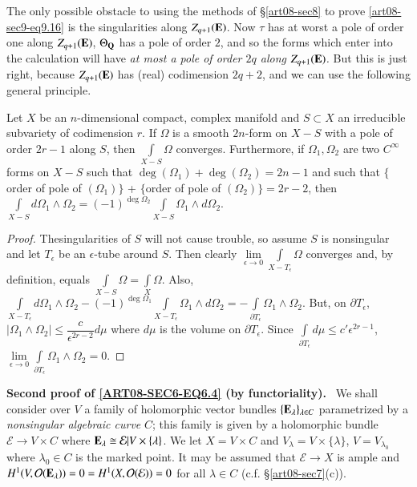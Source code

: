 The only possible obstacle to using the methods of \S\ref{art08-sec8} to prove \eqref{art08-sec9-eq9.16} is the singularities along $Z_{q+1}(\mathbf{E})$. Now $\tau$ has at worst a pole of order one along $Z_{q+1}(\mathbf{E})$, $\Theta_{\mathbf{Q}}$ has a pole of order $2$, and so the forms which enter into the calculation will have {\em at most a pole of order $2q$ along $Z_{q+1}(\mathbf{E})$.} But this is just right, because $Z_{q+1}(\mathbf{E})$ has (real) codimension $2q+2$, and we can use the following general principle.

Let $X$ be an $n$-dimensional compact, complex manifold and $S\subset X$ an irreducible subvariety of codimension $r$. If $\Omega$ is a smooth $2n$-form on $X-S$ with a pole of order $2r-1$ along $S$, then $\int\limits_{X-S}\Omega$ converges. Furthermore, if $\Omega_{1},\Omega_{2}$ are two $C^{\infty}$ forms on $X-S$ such that $\deg(\Omega_{1})+\deg (\Omega_{2})=2n-1$ and such that $\{$order of pole of $(\Omega_{1})\}$ + $\{$order of pole of $(\Omega_{2})\}=2r-2$, then $\int\limits_{X-S}d\Omega_{1}\wedge \Omega_{2}=(-1)^{\deg\Omega_{2}}\int\limits_{X-S}\Omega_{1}\wedge d\Omega_{2}$.

\begin{proof}
The\pageoriginale singularities of $S$ will not cause trouble, so assume $S$ is nonsingular and let $T_{\epsilon}$ be an $\epsilon$-tube around $S$. Then clearly $\lim\limits_{\epsilon\to 0}\int\limits_{X-T_{\epsilon}}\Omega$ converges and, by definition, equals $\int\limits_{X-S}\Omega=\int\limits_{X}\Omega$. Also, $\int\limits_{X-T_{\epsilon}}d\Omega_{1}\wedge\Omega_{2}-(-1)^{\deg \Omega_{1}}\int\limits_{X-T_{\epsilon}}\Omega_{1}\wedge d\Omega_{2}=-\int\limits_{\partial T_{\epsilon}}\Omega_{1}\wedge \Omega_{2}$. But, on $\partial T_{\epsilon}$, $|\Omega_{1}\wedge\Omega_{2}|\leq \dfrac{c}{\epsilon^{2r-2}}d\mu$ where $d\mu$ is the volume on $\partial T_{\epsilon}$. Since $\int\limits_{\partial T_{\epsilon}}d\mu\leq c'\epsilon^{2r-1}$, $\lim\limits_{\epsilon\to 0}\int\limits_{\partial T_{\epsilon}}\Omega_{1}\wedge\Omega_{2}=0$.
\end{proof}

\smallskip
\noindent
{\bf Second proof of \eqref{ART08-SEC6-EQ6.4} (by functoriality).}~ We shall consider over $V$ a family of holomorphic vector bundles $\{\mathbf{E}_{\lambda}\}_{\lambda\in C}$ parametrized by a {\em nonsingular algebraic curve} $C$; this family is given by a holomorphic bundle $\mathcal{E}\to V\times C$ where $\mathbf{E}_{\lambda}\cong \mathcal{E}|V\times \{\lambda\}$. We let $X=V\times C$ and $V_{\lambda}=V\times \{\lambda\}$, $V=V_{\lambda_{0}}$ where $\lambda_{0}\in C$ is the marked point. It may be assumed that $\mathcal{E}\to X$ is ample and $H^{1}(V,\mathcal{O}(\mathbf{E}_{\lambda}))=0= H^{1}(X,\mathcal{O}(\mathcal{E}))=0$ for all $\lambda\in C$ (c.f. \S\ref{art08-sec7}(c)).

